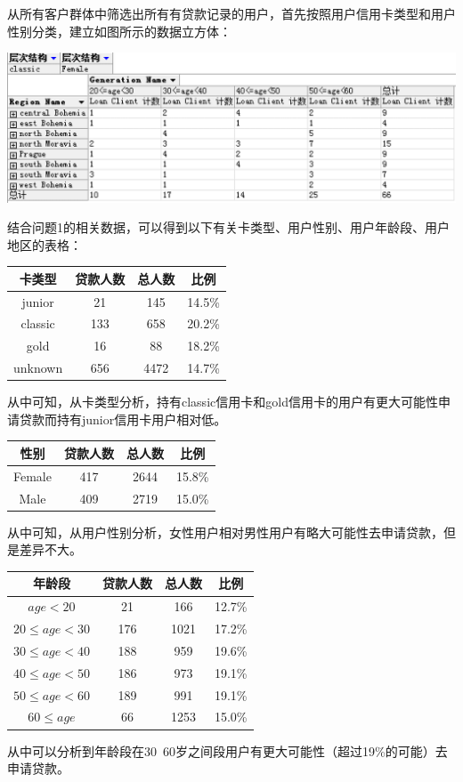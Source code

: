 \documentclass[a4paper]{article}
\begin{document}
\begin{enumerate}
  从所有客户群体中筛选出所有有贷款记录的用户，首先按照用户信用卡类型和用户性别分类，建立如图所示的数据立方体：
  \begin{center}
    \includegraphics[scale=0.5]{Pictures/LOANINFO}
  \end{center}
  结合问题1的相关数据，可以得到以下有关卡类型、用户性别、用户年龄段、用户地区的表格：
  \begin{center}
    \begin{tabular}{c|c|c|c}\hline\hline
      卡类型 & 贷款人数 & 总人数 & 比例\\ \hline
      junior& 21& 145& 14.5\%\\ \hline
      classic& 133& 658& 20.2\%\\ \hline
      gold& 16& 88& 18.2\%\\ \hline
      unknown& 656& 4472& 14.7\%\\ \hline\hline
    \end{tabular}
  \end{center}
  从中可知，从卡类型分析，持有classic信用卡和gold信用卡的用户有更大可能性申请贷款而持有junior信用卡用户相对低。
  \begin{center}
    \begin{tabular}{c|c|c|c} \hline \hline
      性别          & 贷款人数 & 总人数 & 比例\\ \hline
      Female       &417  &2644   &15.8\%\\ \hline
      Male         &409  &2719   &15.0\%\\ \hline\hline
    \end{tabular}
  \end{center}
  从中可知，从用户性别分析，女性用户相对男性用户有略大可能性去申请贷款，但是差异不大。
  \begin{center}
    \begin{tabular}{c|c|c|c} \hline \hline
      年龄段           & 贷款人数 & 总人数 & 比例\\ \hline
      $age<20$        &21   &166   &12.7\%\\ \hline
      $20\le age<30$  &176  &1021  &17.2\%\\ \hline
      $30\le age<40$  &188  &959   &19.6\%\\ \hline
      $40\le age<50$  &186  &973   &19.1\%\\ \hline
      $50\le age<60$  &189  &991   &19.1\%\\ \hline
      $60\le age$     &66   &1253  &15.0\%\\ \hline
      \hline
    \end{tabular}
  \end{center}
  从中可以分析到年龄段在30~60岁之间段用户有更大可能性（超过19\%的可能）去申请贷款。


\end{enumerate}
\end{document}
